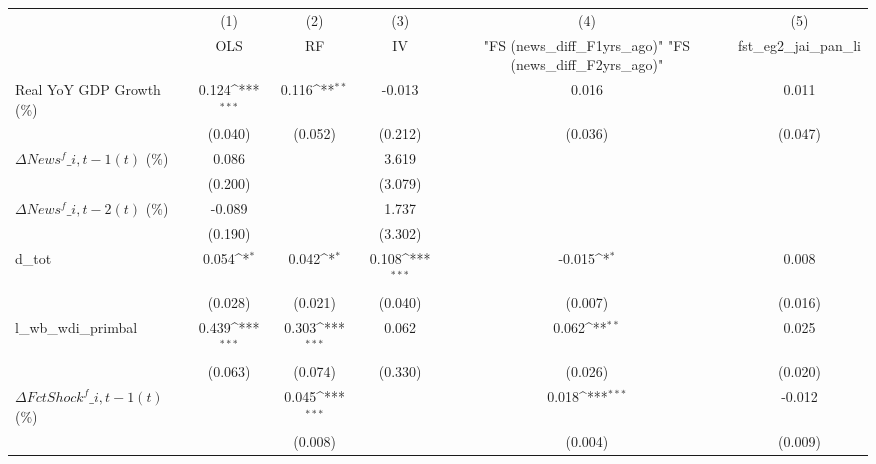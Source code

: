 {
\def\sym#1{\ifmmode^{#1}\else\(^{#1}\)\fi}
\begin{tabular}{l*{5}{c}}
\toprule
                    &\multicolumn{1}{c}{(1)}&\multicolumn{1}{c}{(2)}&\multicolumn{1}{c}{(3)}&\multicolumn{1}{c}{(4)}&\multicolumn{1}{c}{(5)}\\
                    &\multicolumn{1}{c}{OLS}&\multicolumn{1}{c}{RF}&\multicolumn{1}{c}{IV}&\multicolumn{1}{c}{ "FS (news\_diff\_F1yrs\_ago)"  "FS (news\_diff\_F2yrs\_ago)" }&\multicolumn{1}{c}{fst\_eg2\_jai\_pan\_li}\\
\midrule
Real YoY GDP Growth (\%)&       0.124\sym{***}&       0.116\sym{**} &      -0.013         &       0.016         &       0.011         \\
                    &     (0.040)         &     (0.052)         &     (0.212)         &     (0.036)         &     (0.047)         \\
\addlinespace
$ \Delta News^f\_{i,t-1}(t)$ (\%)&       0.086         &                     &       3.619         &                     &                     \\
                    &     (0.200)         &                     &     (3.079)         &                     &                     \\
\addlinespace
$ \Delta News^f\_{i,t-2}(t)$ (\%)&      -0.089         &                     &       1.737         &                     &                     \\
                    &     (0.190)         &                     &     (3.302)         &                     &                     \\
\addlinespace
d\_tot               &       0.054\sym{*}  &       0.042\sym{*}  &       0.108\sym{***}&      -0.015\sym{*}  &       0.008         \\
                    &     (0.028)         &     (0.021)         &     (0.040)         &     (0.007)         &     (0.016)         \\
\addlinespace
l\_wb\_wdi\_primbal    &       0.439\sym{***}&       0.303\sym{***}&       0.062         &       0.062\sym{**} &       0.025         \\
                    &     (0.063)         &     (0.074)         &     (0.330)         &     (0.026)         &     (0.020)         \\
\addlinespace
$ \Delta FctShock^f\_{i,t-1}(t)$ (\%)&                     &       0.045\sym{***}&                     &       0.018\sym{***}&      -0.012         \\
                    &                     &     (0.008)         &                     &     (0.004)         &     (0.009)         \\

\end{tabular}}
